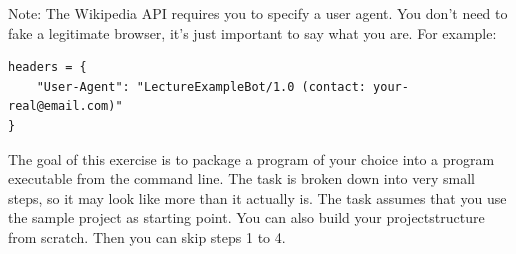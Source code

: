 \documentclass{config/minimal_uebungszettel}
\theoremstyle{definition}
\begin{document}
	\medskip
	\noindent Note: The Wikipedia API requires you to specify a user agent. You don't need to fake a legitimate browser, it's just important to say what you are. For example:
	\begin{lstlisting}[language=pytiny]
headers = {
	"User-Agent": "LectureExampleBot/1.0 (contact: your-real@email.com)"
}
	\end{lstlisting}

\pagebreak

\medskip
\noindent {} \quad


    \noindent The goal of this exercise is to package a program of your choice into a program executable from the command line. The task is broken down into very small steps, so it may look like more than it actually is. \newline
    The task assumes that you use the sample project as starting point. You can also build your projectstructure from scratch. Then you can skip steps 1 to 4.
\end{document}
